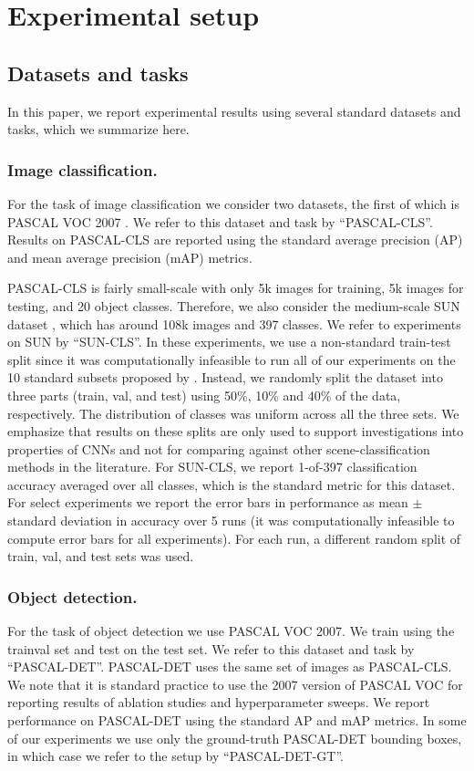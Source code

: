 \section{Experimental setup}
\label{sec:train}

\subsection{Datasets and tasks}
In this paper, we report experimental results using several standard datasets and tasks, which we summarize here.

\subsubsection{Image classification.} For the task of image classification we consider two datasets, the first of which is PASCAL VOC 2007 \cite{Pascal}.
We refer to this dataset and task by ``PASCAL-CLS''.
Results on PASCAL-CLS are reported using the standard average precision (AP) and mean average precision (mAP) metrics.

PASCAL-CLS is fairly small-scale with only 5k images for training, 5k images for testing, and 20 object classes.
Therefore, we also consider the medium-scale SUN dataset \cite{sun}, which has around 108k images and 397 classes.
We refer to experiments on SUN by ``SUN-CLS''.
In these experiments, we use a non-standard train-test split since it was computationally infeasible to run all of our experiments on the 10 standard subsets proposed by \cite{sun}. 
Instead, we randomly split the dataset into three parts (train, val, and test) using 50\%, 10\% and 40\% of the data, respectively. 
The distribution of classes was uniform across all the three sets.
We emphasize that results on these splits are only used to support investigations into properties of CNNs and not for comparing against other scene-classification methods in the literature.
For SUN-CLS, we report 1-of-397 classification accuracy averaged over all classes, which is the standard metric for this dataset.
For select experiments we report the error bars in performance as mean $\pm$ standard deviation in accuracy over 5 runs (it was computationally infeasible to compute error bars for all experiments). For each run, a different random split of train, val, and test sets was used.  

\subsubsection{Object detection.} For the task of object detection we use PASCAL VOC 2007.
We train using the trainval set and test on the test set.
We refer to this dataset and task by ``PASCAL-DET''.
PASCAL-DET uses the same set of images as PASCAL-CLS.
We note that it is standard practice to use the 2007 version of PASCAL VOC for reporting results of ablation studies and hyperparameter sweeps.
We report performance on PASCAL-DET using the standard AP and mAP metrics.
In some of our experiments we use only the ground-truth PASCAL-DET bounding boxes, in which case we refer to the setup by ``PASCAL-DET-GT''.

